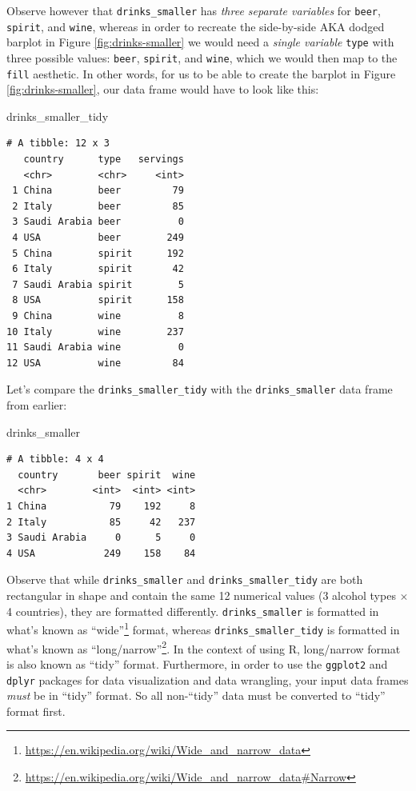 \documentclass[12pt, krantz2,]{krantz}
\makeatletter
\newenvironment{Shaded}{\begin{snugshade}}{\end{snugshade}}
\newcommand{\NormalTok}[1]{#1}
\renewcommand{\href}[2]{#2\footnote{\url{#1}}}
\newenvironment{kframe}{%
\medskip{}
\setlength{\fboxsep}{.8em}
 \def\at@end@of@kframe{}%
 \ifinner\ifhmode%
  \def\at@end@of@kframe{\end{minipage}}%
  \begin{minipage}{\columnwidth}%
 \fi\fi%
 \def\FrameCommand##1{\hskip\@totalleftmargin \hskip-\fboxsep
 \colorbox{shadecolor}{##1}\hskip-\fboxsep
     \hskip-\linewidth \hskip-\@totalleftmargin \hskip\columnwidth}%
 \MakeFramed {\advance\hsize-\width
   \@totalleftmargin\z@ \linewidth\hsize
   \@setminipage}}%
 {\par\unskip\endMakeFramed%
 \at@end@of@kframe}
\renewenvironment{Shaded}{\begin{kframe}}{\end{kframe}}
\makeatother
\begin{document}
Observe however that \texttt{drinks\_smaller} has \emph{three separate variables} for \texttt{beer}, \texttt{spirit}, and \texttt{wine}, whereas in order to recreate the side-by-side AKA dodged barplot in Figure \ref{fig:drinks-smaller} we would need a \emph{single variable} \texttt{type} with three possible values: \texttt{beer}, \texttt{spirit}, and \texttt{wine}, which we would then map to the \texttt{fill} aesthetic. In other words, for us to be able to create the barplot in Figure \ref{fig:drinks-smaller}, our data frame would have to look like this:

\begin{Shaded}
\begin{Highlighting}[]
\NormalTok{drinks_smaller_tidy}
\end{Highlighting}
\end{Shaded}

\begin{verbatim}
# A tibble: 12 x 3
   country      type   servings
   <chr>        <chr>     <int>
 1 China        beer         79
 2 Italy        beer         85
 3 Saudi Arabia beer          0
 4 USA          beer        249
 5 China        spirit      192
 6 Italy        spirit       42
 7 Saudi Arabia spirit        5
 8 USA          spirit      158
 9 China        wine          8
10 Italy        wine        237
11 Saudi Arabia wine          0
12 USA          wine         84
\end{verbatim}

Let's compare the \texttt{drinks\_smaller\_tidy} with the \texttt{drinks\_smaller} data frame from earlier:

\begin{Shaded}
\begin{Highlighting}[]
\NormalTok{drinks_smaller}
\end{Highlighting}
\end{Shaded}

\begin{verbatim}
# A tibble: 4 x 4
  country       beer spirit  wine
  <chr>        <int>  <int> <int>
1 China           79    192     8
2 Italy           85     42   237
3 Saudi Arabia     0      5     0
4 USA            249    158    84
\end{verbatim}

Observe that while \texttt{drinks\_smaller} and \texttt{drinks\_smaller\_tidy} are both rectangular in shape and contain the same 12 numerical values (3 alcohol types \(\times\) 4 countries), they are formatted differently. \texttt{drinks\_smaller} is formatted in what's known as \href{https://en.wikipedia.org/wiki/Wide_and_narrow_data}{``wide''} format, whereas \texttt{drinks\_smaller\_tidy} is formatted in what's known as \href{https://en.wikipedia.org/wiki/Wide_and_narrow_data\#Narrow}{``long/narrow''}. In the context of using R, long/narrow format is also known as ``tidy'' format. Furthermore, in order to use the \texttt{ggplot2} and \texttt{dplyr} packages for data visualization and data wrangling, your input data frames \emph{must} be in ``tidy'' format. So all non-``tidy'' data must be converted to ``tidy'' format first.
\end{document}
